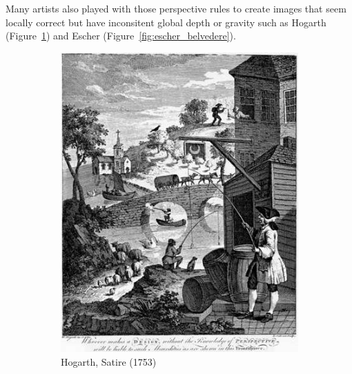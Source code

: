 Many artists also played with those perspective rules to create images
that seem locally correct but have inconsitent global depth or gravity
such as Hogarth (Figure~\ref{fig:hogarth_satire})
and Escher (Figure~\ref{fig:escher_belvedere}).

\begin{figure}[h]
\centering
\begin{subfigure}[b]{0.52\textwidth}
	\includegraphics[width=\textwidth]{assets/img/hogarth_satire.jpg}
	\caption{Hogarth, Satire (1753)}%
	\label{fig:hogarth_satire}
\end{subfigure}
\hfill
\begin{subfigure}[b]{0.42\textwidth}

\end{subfigure}
\end{figure}
